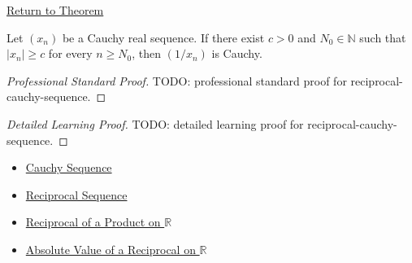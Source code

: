 \newpage
{}
\label{prf:reciprocal-cauchy-sequence}

\begin{remark*}[Return]
\hyperref[thm:reciprocal-cauchy-sequence]{Return to Theorem}
\end{remark*}

\begin{theorem*}
Let $(x_n)$ be a Cauchy real sequence. If there exist $c>0$ and
$N_0\in\mathbb{N}$ such that $|x_n|\ge c$ for every $n\ge N_0$, then
$(1/x_n)$ is Cauchy.

\smallskip
\noindent
\end{theorem*}

\begin{proof}[Professional Standard Proof]
\LRAProofBodyStart
TODO: professional standard proof for reciprocal-cauchy-sequence.
\end{proof}

\begin{proof}[Detailed Learning Proof]
\LRAProofBodyStart
TODO: detailed learning proof for reciprocal-cauchy-sequence.
\end{proof}

\begin{remark*}
\end{remark*}

\begin{dependencies}
\begin{itemize}
  \item \hyperref[def:cauchy-sequence]{Cauchy Sequence}
  \item \hyperref[def:reciprocal-sequence]{Reciprocal Sequence}
  \item \hyperref[thm:reciprocal-of-product-on-r]{Reciprocal of a Product on $\mathbb{R}$}
  \item \hyperref[thm:absolute-value-of-reciprocal-r]{Absolute Value of a Reciprocal on $\mathbb{R}$}
\end{itemize}
\end{dependencies}

\clearpage
